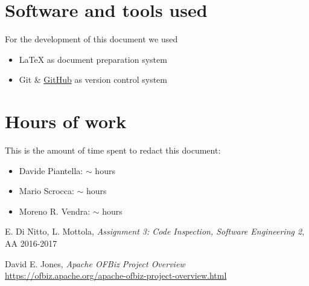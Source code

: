 \begin{appendices}

	\section{Software and tools used}
	For the development of this document we used
	\begin{itemize}
		\item \LaTeX{} as document preparation system
		\item Git \& \href{http://github.com}{GitHub} as version control system
	\end{itemize}
	
	\section{Hours of work}
	This is the amount of time spent to redact this document:
	\begin{itemize}
		\item Davide Piantella: $\sim$ hours
		\item Mario Scrocca: $\sim$ hours
		\item Moreno R. Vendra: $\sim$ hours
	\end{itemize}
	
\end{appendices}


\begin{thebibliography}{9}

 E. Di Nitto, L. Mottola, \emph{Assignment 3: Code Inspection, Software Engineering 2}, AA 2016-2017

 David E. Jones, \emph{Apache OFBiz Project Overview}\\
\url{https://ofbiz.apache.org/apache-ofbiz-project-overview.html}

\end{thebibliography}